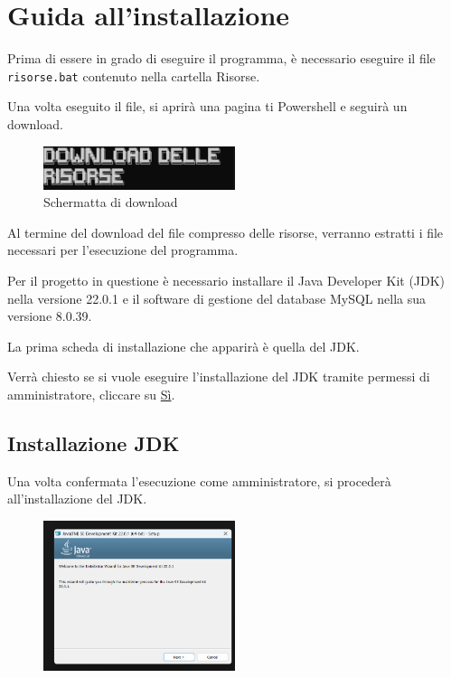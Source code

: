 \section{Guida all'installazione}

Prima di essere in grado di eseguire il programma, è necessario eseguire il file \texttt{risorse.bat} contenuto nella cartella Risorse. 


Una volta eseguito il file, si aprirà una pagina ti Powershell e seguirà un download.

\begin{figure}[h!]
    \centering
    \includegraphics[width= 0.5\textwidth]{images/nuova docs.png}
    \caption{Schermatta di download}
\end{figure}

Al termine del download del file compresso delle risorse, verranno estratti i file necessari per l'esecuzione del programma.



Per il progetto in questione è necessario installare il Java Developer Kit (JDK) nella versione 22.0.1 e il software di gestione del database MySQL nella sua versione 8.0.39. 

La prima scheda di installazione che apparirà è quella del JDK. 

Verrà chiesto se si vuole eseguire l'installazione del JDK tramite permessi di amministratore, cliccare su \underline{Sì}.

\subsection{Installazione JDK}

Una volta confermata l'esecuzione come amministratore, si procederà all'installazione del JDK.

\begin{figure}[h!]
    \centering
    \includegraphics[width= 0.5\textwidth]{images/installazione java.png}
\end{figure}

